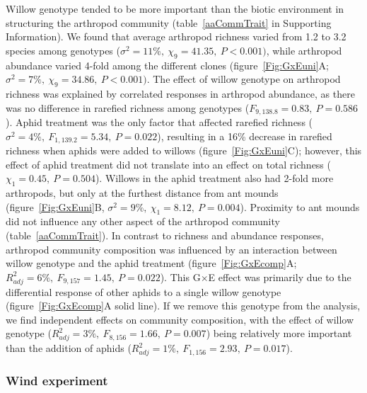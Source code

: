 \documentclass[11pt]{article}
\begin{document}
Willow genotype tended to be more important than the biotic environment
in structuring the arthropod community (table~\ref{aaCommTrait} in Supporting
Information). We found that average arthropod richness varied from 1.2 to 3.2
species among genotypes (\(\sigma^2=11\%,\ \chi_9=41.35,\ P<0.001)\), while arthropod abundance
varied 4-fold among the different clones (figure~\ref{Fig:GxEuni}A; \(\sigma^2=7\%,\ \chi_9=34.86,\ P<0.001)\).
The effect of willow genotype on arthropod richness was explained by
correlated responses in arthropod abundance, as there was no difference
in rarefied richness among genotypes (\(F_{9,138.8}=0.83,\ P=0.586\)). Aphid
treatment was the only factor that affected rarefied richness
(\(\)\(\sigma^2=4\%,\ F_{1,139.2}=5.34,\ P=0.022\)), resulting in a 16\% decrease in
rarefied richness when aphids were added to willows (figure~\ref{Fig:GxEuni}C); however,
this effect of aphid treatment did not translate into an effect on total
richness (\(\chi_1=0.45,\ P=0.504\)). Willows in the aphid treatment also had
2-fold more arthropods, but only at the furthest distance from ant
mounds (figure~\ref{Fig:GxEuni}B, \(\sigma^2=9\%,\ \chi_1=8.12,\ P=0.004\)). Proximity to ant mounds did not
influence any other aspect of the arthropod community (table~\ref{aaCommTrait}). In
contrast to richness and abundance responses, arthropod community
composition was influenced by an interaction between willow genotype and
the aphid treatment (figure~\ref{Fig:GxEcomp}A; \(R_{adj}^2=6\%,\ F_{9,157}=1.45,\ P=0.022\)). This
G\(\times\)E effect was primarily due to the differential
response of other aphids to a single willow genotype (figure~\ref{Fig:GxEcomp}A solid
line). If we remove this genotype from the analysis, we find
independent effects on community composition, with the effect of willow
genotype (\(R_{adj}^2=3\%,\ F_{8,156}=1.66,\ P=0.007\)) being relatively more important than the
addition of aphids (\(R_{adj}^2=1\%,\ F_{1,156}=2.93,\ P=0.017\)).


\subsubsection*{Wind experiment}
\end{document}
